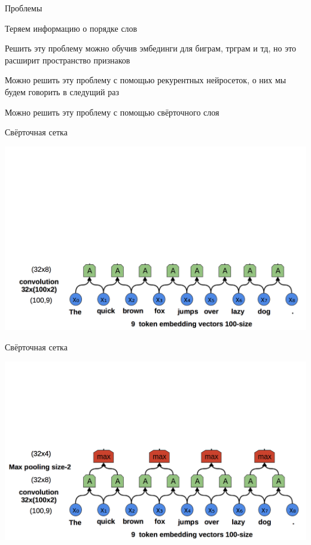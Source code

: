 \documentclass[notes,12pt, aspectratio=169]{beamer}
\newenvironment{wideitemize}{\itemize\addtolength{\itemsep}{10pt}}{\enditemize}
\begin{document}
\begin{frame}{Проблемы}
\begin{wideitemize} 
	\item  Теряем информацию о порядке слов 
	\item  Решить эту проблему можно обучив эмбединги для биграм, трграм и тд, но это расширит пространство признаков
	\item  Можно решить эту проблему с помощью рекурентных нейросеток, о них мы будем говорить в следущий раз 
	\item  \alert{Можно решить эту проблему с помощью свёрточного слоя}
\end{wideitemize} 
\end{frame} 


\begin{frame}{Свёрточная сетка}
\begin{center}
	\includegraphics[width=.75\linewidth]{conv1.png}
\end{center}
\end{frame} 


\begin{frame}{Свёрточная сетка}
\begin{center}
	\includegraphics[width=.75\linewidth]{conv2.png}
\end{center}
\end{frame} 
\end{document}
